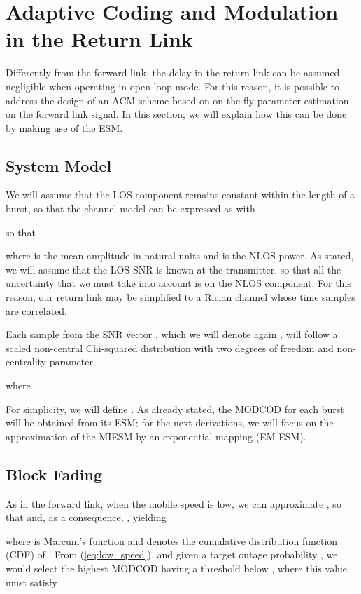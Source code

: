 \documentclass[journal,onecolumn,10pt,a4paper]{IEEEtran}
\begin{document}
 \section{Adaptive Coding and Modulation in the Return Link}
\label{sec:rl}
Differently from the forward link, the delay in the return link can be assumed negligible when operating in open-loop mode. For this reason, it is possible to address the design of an ACM scheme based on on-the-fly parameter estimation on the forward link signal. In this section, we will explain how this can be done by making use of the ESM.

\subsection{System Model}
\label{sec:sys_model_rl}
We will assume that the LOS component remains constant within the length of a burst, so that the channel model can be expressed as  with

so that

where  is the mean amplitude in natural units and  is the NLOS power. As stated, we will assume that the LOS SNR is known at the transmitter, so that all the uncertainty that we must take into account is on the NLOS component. For this reason, our return link may be simplified to a Rician channel whose time samples are correlated.

Each sample from the SNR vector , which we will denote again , will follow a scaled non-central Chi-squared distribution with two degrees of freedom and non-centrality parameter 

where

For simplicity, we will define . As already stated, the MODCOD for each burst will be obtained from its ESM; for the next derivations, we will focus on the approximation of the MIESM by an exponential mapping (EM-ESM).


\subsection{Block Fading}
\label{sec:block_fading_rl}
As in the forward link, when the mobile speed is low, we can approximate , so that  and, as a consequence, , yielding

where  is Marcum's  function and  denotes the cumulative distribution function (CDF) of . From (\ref{eq:low_speed}), and given a target outage probability , we would select the highest MODCOD having a threshold below , where this value must satisfy
\end{document}
